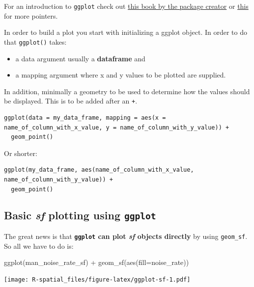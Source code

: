 \documentclass[
  11pt,
]{book}
\newenvironment{Shaded}{\begin{snugshade}}{\end{snugshade}}
\newcommand{\AttributeTok}[1]{\textcolor[rgb]{0.77,0.63,0.00}{#1}}
\newcommand{\FunctionTok}[1]{\textcolor[rgb]{0.00,0.00,0.00}{#1}}
\newcommand{\NormalTok}[1]{#1}
\newcommand{\SpecialCharTok}[1]{\textcolor[rgb]{0.00,0.00,0.00}{#1}}
\providecommand{\tightlist}{%
  \setlength{\itemsep}{0pt}\setlength{\parskip}{0pt}}
\begin{document}
For an introduction to \texttt{ggplot} check out \href{http://link.springer.com/book/10.1007\%2F978-3-319-24277-4}{this book by the package creator} or \href{http://ggplot2.tidyverse.org/}{this} for more pointers.

In order to build a plot you start with initializing a ggplot object. In order to do that
\texttt{ggplot()} takes:

\begin{itemize}
\tightlist
\item
  a data argument usually a \textbf{dataframe} and
\item
  a mapping argument where x and y values to be plotted are supplied.
\end{itemize}

In addition, minimally a geometry to be used to determine how the values should be displayed. This is to be added after an \texttt{+}.

\begin{verbatim}
ggplot(data = my_data_frame, mapping = aes(x = name_of_column_with_x_value, y = name_of_column_with_y_value)) +
  geom_point()
\end{verbatim}

Or shorter:

\begin{verbatim}
ggplot(my_data_frame, aes(name_of_column_with_x_value, name_of_column_with_y_value)) +
  geom_point()
\end{verbatim}

\hypertarget{basic-sf-plotting-using-ggplot}{%
\subsection{\texorpdfstring{Basic \emph{sf} plotting using \texttt{ggplot}}{Basic sf plotting using ggplot}}\label{basic-sf-plotting-using-ggplot}}

The great news is that \textbf{\texttt{ggplot} can plot \emph{sf} objects directly} by using \texttt{geom\_sf}. So all we have to do is:

\begin{Shaded}
\begin{Highlighting}[]
\FunctionTok{ggplot}\NormalTok{(man\_noise\_rate\_sf) }\SpecialCharTok{+} 
  \FunctionTok{geom\_sf}\NormalTok{(}\FunctionTok{aes}\NormalTok{(}\AttributeTok{fill=}\NormalTok{noise\_rate))}
\end{Highlighting}
\end{Shaded}

\texttt{[image: R-spatial\_files/figure-latex/ggplot-sf-1.pdf]}
\end{document}
